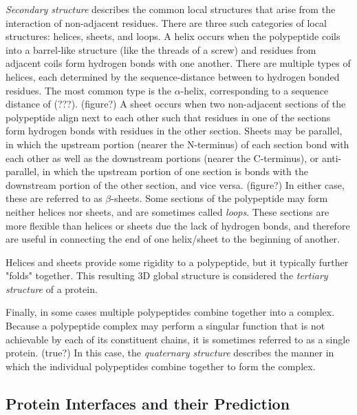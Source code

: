 \textit{Secondary structure} describes the common local structures that arise from the interaction of non-adjacent residues.
There are three such categories of local structures: helices, sheets, and loops.
A helix occurs when the polypeptide coils into a barrel-like structure (like the threads of a screw) and residues from adjacent coils form hydrogen bonds with one another.
There are multiple types of helices, each determined by the sequence-distance between to hydrogen bonded residues.
The most common type is the $\alpha$-helix, corresponding to a sequence distance of (???). (figure?)
A sheet occurs when two non-adjacent sections of the polypeptide align next to each other such that residues in one of the sections form hydrogen bonds with residues in the other section.
Sheets may be parallel, in which the upstream portion (nearer the N-terminus) of each section bond with each other as well as the downstream portions (nearer the C-terminus), or anti-parallel, in which the upstream portion of one section is bonds with the downstream portion of the other section, and vice versa. (figure?)
In either case, these are referred to as $\beta$-sheets. 
Some sections of the polypeptide may form neither helices nor sheets, and are sometimes called \textit{loops}.
These sections are more flexible than helices or sheets due the lack of hydrogen bonds, and therefore are useful in connecting the end of one helix/sheet to the beginning of another. 

Helices and sheets provide some rigidity to a polypeptide, but it typically further "folds" together. This resulting 3D global structure is considered the \textit{tertiary structure} of a protein. 

Finally, in some cases multiple polypeptides combine together into a complex.
Because a polypeptide complex may perform a singular function that is not achievable by each of its constituent chains, it is sometimes referred to as a single protein.  (true?)
In this case, the \textit{quaternary structure} describes the manner in which the individual polypeptides combine together to form the complex. 



\subsection{Protein Interfaces and their Prediction}

